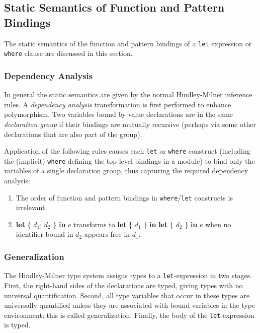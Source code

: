 \subsection{Static Semantics of Function and Pattern Bindings} \label{letsemantics}

The static semantics of the function and pattern bindings of a \texttt{let} expression or \texttt{where} clause are discussed in this section.

\subsubsection{Dependency Analysis} \label{declgroup}

In general the static semantics are given by the normal Hindley-Milner inference rules.
A \emph{dependency analysis} transformation is first performed to enhance polymorphism.
Two variables bound by value declarations are in the same \emph{declaration group} if their bindings are mutually recursive (perhaps via some other declarations that are also part of the group).

Application of the following rules causes each \texttt{let} or \texttt{where} construct (including the (implicit) \texttt{where} defining the top level bindings in a module) to bind only the variables of a single declaration group, thus capturing the required dependency analysis:

\begin{enumerate}
\item The order of function and pattern bindings in \texttt{where}/\texttt{let} constructs is irrelevant.
\item \textbf{let} \{ $d_1$; $d_2$ \} \textbf{in} $e$ transforms to \textbf{let} \{ $d_1$  \} \textbf{in} \textbf{let} \{ $d_2$ \} \textbf{in} $e$ when no identifier bound in $d_2$ appears free in $d_1$.
\end{enumerate}

\subsubsection{Generalization} \label{generalization}

The Hindley-Milner type system assigns types to a \texttt{let}-expression in two stages.
First, the right-hand sides of the declarations are typed, giving types with no universal quantification.
Second, all type variables that occur in these types are universally quantified unless they are associated with bound variables in the type environment; this is called generalization.
Finally, the body of the \texttt{let}-expression is typed.

